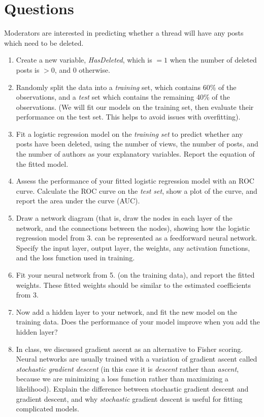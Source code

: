 \documentclass[11pt]{article}
\begin{document}
\section*{Questions}

Moderators are interested in predicting whether a thread will have any posts which need to be deleted.

\begin{enumerate}
\item Create a new variable, \textit{HasDeleted}, which is $= 1$ when the number of deleted posts is $> 0$, and 0 otherwise.

\item Randomly split the data into a \textit{training} set, which contains 60\% of the observations, and a \textit{test} set which contains the remaining 40\% of the observations. (We will fit our models on the training set, then evaluate their performance on the test set. This helps to avoid issues with overfitting).

\item Fit a logistic regression model on the \textit{training set} to predict whether any posts have been deleted, using the number of views, the number of posts, and the number of authors as your explanatory variables. Report the equation of the fitted model.

\item Assess the performance of your fitted logistic regression model with an ROC curve. Calculate the ROC curve on the \textit{test set}, show a plot of the curve, and report the area under the curve (AUC).

\item Draw a network diagram (that is, draw the nodes in each layer of the network, and the connections between the nodes), showing how the logistic regression model from 3. can be represented as a feedforward neural network. Specify the input layer, output layer, the weights, any activation functions, and the loss function used in training.

\item Fit your neural network from 5. (on the training data), and report the fitted weights. These fitted weights should be similar to the estimated coefficients from 3.

\item Now add a hidden layer to your network, and fit the new model on the training data. Does the performance of your model improve when you add the hidden layer?

\item In class, we discussed gradient ascent as an alternative to Fisher scoring. Neural networks are usually trained with a variation of gradient ascent called \textit{stochastic gradient descent} (in this case it is \textit{descent} rather than \textit{ascent}, because we are minimizing a loss function rather than maximizing a likelihood). Explain the difference between stochastic gradient descent and gradient descent, and why \textit{stochastic} gradient descent is useful for fitting complicated models.
\end{enumerate}
\end{document}
